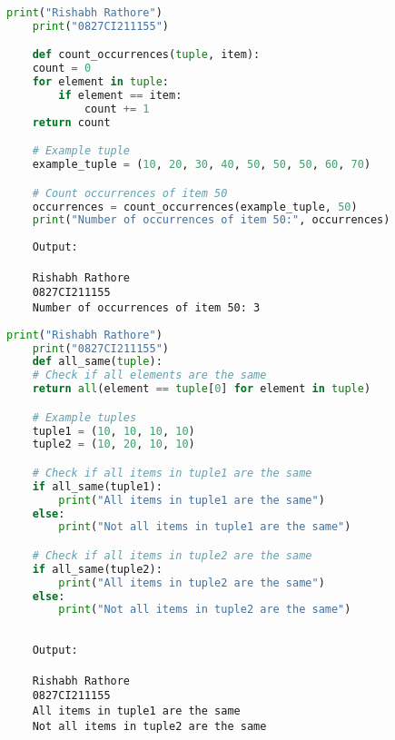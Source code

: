 \documentclass{report}
\begin{document}
\newpage

\sol 
\begin{lstlisting}[language=Python]
	print("Rishabh Rathore")
	print("0827CI211155")

	def count_occurrences(tuple, item):
    count = 0
    for element in tuple:
        if element == item:
            count += 1
    return count

	# Example tuple
	example_tuple = (10, 20, 30, 40, 50, 50, 50, 60, 70)

	# Count occurrences of item 50
	occurrences = count_occurrences(example_tuple, 50)
	print("Number of occurrences of item 50:", occurrences)


\end{lstlisting}

\begin{verbatim}
	Output:

	Rishabh Rathore
	0827CI211155
	Number of occurrences of item 50: 3
\end{verbatim}



\newpage

\sol 
\begin{lstlisting}[language=Python]
	print("Rishabh Rathore")
	print("0827CI211155")
	def all_same(tuple):
    # Check if all elements are the same
    return all(element == tuple[0] for element in tuple)

	# Example tuples
	tuple1 = (10, 10, 10, 10)
	tuple2 = (10, 20, 10, 10)

	# Check if all items in tuple1 are the same
	if all_same(tuple1):
		print("All items in tuple1 are the same")
	else:
		print("Not all items in tuple1 are the same")

	# Check if all items in tuple2 are the same
	if all_same(tuple2):
		print("All items in tuple2 are the same")
	else:
		print("Not all items in tuple2 are the same")
  

\end{lstlisting}

\begin{verbatim}
	Output:

	Rishabh Rathore
	0827CI211155
	All items in tuple1 are the same
	Not all items in tuple2 are the same

\end{verbatim}
\end{document}
